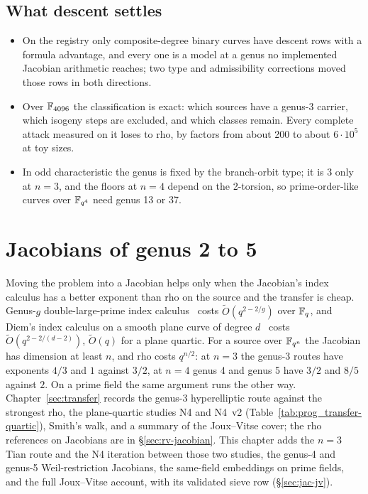 \section{What descent settles}\label{sec:ghs-summary}

\begin{itemize}
\item On the registry only composite-degree binary curves have descent rows
  with a formula advantage, and every one is a model at a genus no
  implemented Jacobian arithmetic reaches; two type and admissibility
  corrections moved those rows in both directions.
\item Over $\mathbb{F}_{4096}$ the classification is exact: which sources have a
  genus-3 carrier, which isogeny steps are excluded, and which classes
  remain. Every complete attack measured on it loses to rho, by factors from
  about 200 to about $6\cdot10^5$ at toy sizes.
\item In odd characteristic the genus is fixed by the branch-orbit type; it
  is 3 only at $n=3$, and the floors at $n=4$ depend on the 2-torsion, so
  prime-order-like curves over $\mathbb{F}_{q^4}$ need genus 13 or 37.
\end{itemize}
\chapter{Jacobians of genus 2 to 5}\label{ch:jacobians}

Moving the problem into a Jacobian helps only when the Jacobian's index
calculus has a better exponent than rho on the source and the transfer is
cheap. Genus-$g$ double-large-prime index calculus~\cite{gtthd2007} costs
$\tilde O(q^{2-2/g})$ over $\mathbb{F}_q$, and Diem's index calculus on a smooth
plane curve of degree $d$~\cite{diem2006,dt2008} costs $\tilde O(q^{2-2/(d-2)})$,
$\tilde O(q)$ for a plane quartic. For a source over $\mathbb{F}_{q^n}$ the
Jacobian has dimension at least $n$, and rho costs $q^{n/2}$: at $n=3$ the
genus-3 routes have exponents $4/3$ and $1$ against $3/2$, at $n=4$ genus 4
and genus 5 have $3/2$ and $8/5$ against $2$. On a prime field the same
argument runs the other way. Chapter~\ref{sec:transfer} records the
genus-3 hyperelliptic route against the strongest rho, the plane-quartic
studies N4 and N4~v2 (Table~\ref{tab:prog_transfer-quartic}), Smith's walk,
and a summary of the Joux--Vitse cover; the rho references on Jacobians
are in \S\ref{sec:rv-jacobian}. This chapter adds the $n=3$ Tian route and
the N4 iteration between those two studies, the genus-4 and genus-5
Weil-restriction Jacobians, the same-field embeddings on prime fields, and
the full Joux--Vitse account, with its validated sieve row (\S\ref{sec:jac-jv}).

